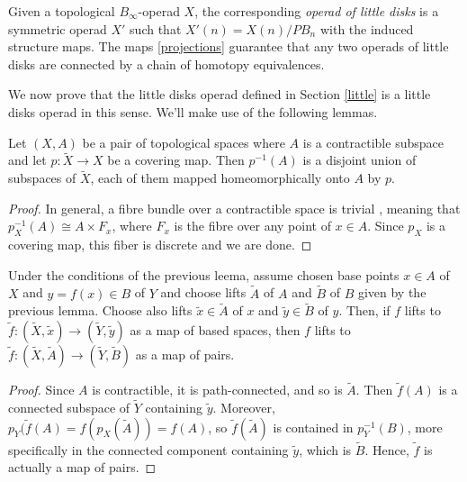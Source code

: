 \documentclass[TFM.tex]{subfiles}
\begin{document}
Given a topological $B_\infty$-operad $X$, the corresponding \emph{operad of little disks} is a symmetric operad $X'$ such that $X'(n)=X(n)/PB_n$ with the induced structure maps. The maps \ref{projections} guarantee that any two operads of little disks are connected by a chain of homotopy equivalences.


We now prove that the little disks operad defined in Section \ref{little} is a little disks operad in this sense. We'll make use of the following lemmas.

\begin{lemma}\label{contractible}
Let $(X,A)$ be a pair of topological spaces where $A$ is a contractible subspace  and let $p:\widetilde{X}\to X$ be a covering map. Then $p^{-1}(A)$ is a disjoint union of subspaces of $\widetilde{X}$, each of them mapped homeomorphically onto $A$ by $p$. 
\end{lemma}
\begin{proof}
In general, a fibre bundle over a contractible space is trivial \cite[Proposition 3.5]{bundle}, meaning that $p_X^{-1}(A)\cong A\times F_{x}$, where $F_x$ is the fibre over any point of $x\in A$. Since $p_X$ is a covering map, this fiber is discrete and we are done. 
\end{proof}

\begin{lemma}\label{lift}
Under the conditions of the previous leema, assume chosen base points $x\in A$ of $X$ and $y=f(x)\in B$ of $Y$ and choose lifts $\widetilde{A}$ of $A$ and $\widetilde{B}$ of $B$ given by the previous lemma. Choose also lifts $\widetilde{x}\in\widetilde{A}$ of $x$ and $\widetilde{y}\in\widetilde{B}$ of $y$. Then, if $f$ lifts to $\widetilde{f}:(\widetilde{X},\widetilde{x})\to (\widetilde{Y},\widetilde{y})$ as a map of based spaces, then $f$ lifts to $\widetilde{f}:(\widetilde{X},\widetilde{A})\to (\widetilde{Y},\widetilde{B})$ as a map of pairs. 
\end{lemma}
\begin{proof}
Since $A$ is contractible, it is path-connected, and so is $\widetilde{A}$. Then $\widetilde{f}(A)$ is a connected subspace of $\widetilde{Y}$ containing $\widetilde{y}$. Moreover, $p_Y(\widetilde{f}(A)=f(p_X(\widetilde{A}))=f(A)$, so $\widetilde{f}(\widetilde{A})$ is contained in $p_Y^{-1}(B)$, more specifically in the connected component containing $\widetilde{y}$, which is $\widetilde{B}$. Hence, $\widetilde{f}$ is actually a map of pairs.
\end{proof}
\end{document}
